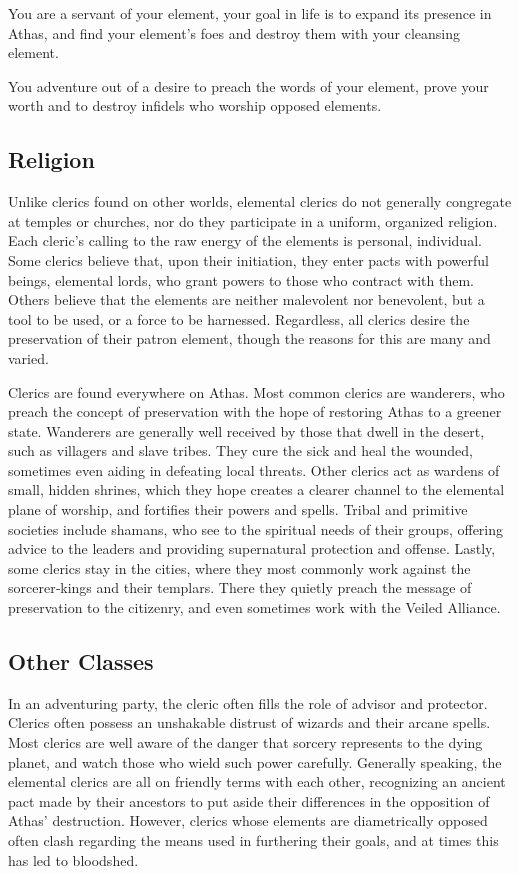 \documentclass[10pt,a4paper,twocolumn]{d20}
\begin{document}
{You are a servant of your element, your goal in life is to expand its presence in Athas, and find your element’s foes and destroy them with your cleansing element.

You adventure out of a desire to preach the words of your element, prove your worth and to destroy infidels who worship opposed elements.

\subsection{Religion}

Unlike clerics found on other worlds, elemental clerics do not generally congregate at temples or churches, nor do they participate in a uniform, organized religion. Each cleric’s calling to the raw energy of the elements is personal, individual. Some clerics believe that, upon their initiation, they enter pacts with powerful beings, elemental lords, who grant powers to those who contract with them. Others believe that the elements are neither malevolent nor benevolent, but a tool to be used, or a force to be harnessed. Regardless, all clerics desire the preservation of their patron element, though the reasons for this are many and varied.

Clerics are found everywhere on Athas. Most common clerics are wanderers, who preach the concept of preservation with the hope of restoring Athas to a greener state. Wanderers are generally well received by those that dwell in the desert, such as villagers and slave tribes. They cure the sick and heal the wounded, sometimes even aiding in defeating local threats. Other clerics act as wardens of small, hidden shrines, which they hope creates a clearer channel to the elemental plane of worship, and fortifies their powers and spells. Tribal and primitive societies include shamans, who see to the spiritual needs of their groups, offering advice to the leaders and providing supernatural protection and offense. Lastly, some clerics stay in the cities, where they most commonly work against the sorcerer‐kings and their templars. There they quietly preach the message of preservation to the citizenry, and even sometimes work with the Veiled Alliance.

\subsection{Other Classes}

In an adventuring party, the cleric often fills the role of advisor and protector. Clerics often possess an unshakable distrust of wizards and their arcane spells. Most clerics are well aware of the danger that sorcery represents to the dying planet, and watch those who wield such power carefully. Generally speaking, the elemental clerics are all on friendly terms with each other, recognizing an ancient pact made by their ancestors to put aside their differences in the opposition of Athas’ destruction. However, clerics whose elements are diametrically opposed often clash regarding the means used in furthering their goals, and at times this has led to bloodshed.

}
\end{document}
